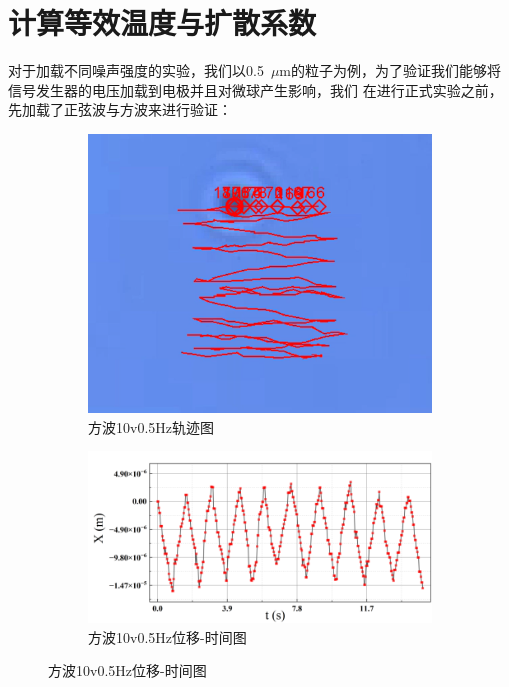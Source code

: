 \documentclass[a4paper]{report} %
\begin{document}
\section{计算等效温度与扩散系数}
对于加载不同噪声强度的实验，我们以0.5~$\mu$m的粒子为例，为了验证我们能够将信号发生器的电压加载到电极并且对微球产生影响，我们
在进行正式实验之前，先加载了正弦波与方波来进行验证：\par
\begin{figure}[H]
    \centering
    \begin{subfigure}{0.3\textwidth}
        \includegraphics[width=\linewidth]{10v0.5Hz.png}
        \caption{方波10v0.5Hz轨迹图}
    \end{subfigure}
    \begin{subfigure}{0.6\textwidth}
        \includegraphics[width=\linewidth]{10v0.5Hz1.png}
        \caption{方波10v0.5Hz位移-时间图}
    \end{subfigure}


\end{figure}
\end{document}
